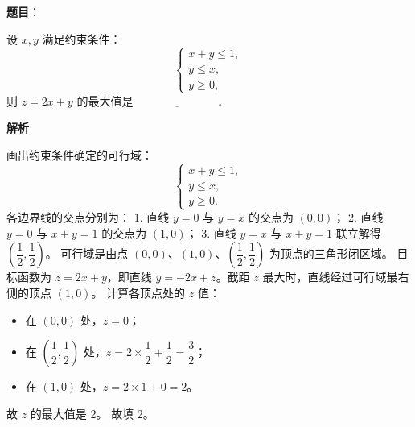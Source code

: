 \begin{answer}

\textbf{题目}：

设 $x,y$ 满足约束条件：
\nopagebreak[4]
\[
\begin{cases}
x+y\leqslant 1,\\
y\leqslant x,\\
y\geqslant 0,
\end{cases}
\]
则 $z=2x+y$ 的最大值是 $\underline{\hspace{3cm}}$．

\textbf{解析}

画出约束条件确定的可行域：
\nopagebreak[4]
\[
\begin{cases}
x+y\leqslant 1,\\
y\leqslant x,\\
y\geqslant 0.
\end{cases}
\]
各边界线的交点分别为：
1. 直线 $y=0$ 与 $y=x$ 的交点为 $(0,0)$；
2. 直线 $y=0$ 与 $x+y=1$ 的交点为 $(1,0)$；
3. 直线 $y=x$ 与 $x+y=1$ 联立解得 $\left(\dfrac{1}{2},\dfrac{1}{2}\right)$。
可行域是由点 $(0,0)$、$(1,0)$、$\left(\dfrac{1}{2},\dfrac{1}{2}\right)$ 为顶点的三角形闭区域。
目标函数为 $z=2x+y$，即直线 $y=-2x+z$。截距 $z$ 最大时，直线经过可行域最右侧的顶点 $(1,0)$。
计算各顶点处的 $z$ 值：
\begin{itemize}
\item 在 $(0,0)$ 处，$z=0$；
\item 在 $\left(\dfrac{1}{2},\dfrac{1}{2}\right)$ 处，$z=2\times\dfrac{1}{2}+\dfrac{1}{2}=\dfrac{3}{2}$；
\item 在 $(1,0)$ 处，$z=2\times 1+0=2$。
\end{itemize}
故 $z$ 的最大值是 2。
故填 2。


\end{answer}

